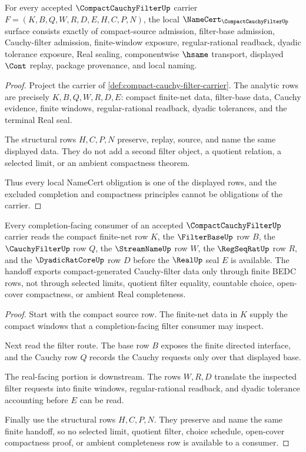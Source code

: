 \begin{theorem}
\label{thm:compact-cauchy-filter-namecert-obligations}
For every accepted $\CompactCauchyFilterUp$ carrier $F=(K,B,Q,W,R,D,E,H,C,P,N)$, the local $\NameCert_{\CompactCauchyFilterUp}$ surface consists exactly of compact-source admission, filter-base admission, Cauchy-filter admission, finite-window exposure, regular-rational readback, dyadic tolerance exposure, Real sealing, componentwise $\hsame$ transport, displayed $\Cont$ replay, package provenance, and local naming.
\end{theorem}
\begin{proof}
Project the carrier of \autoref{def:compact-cauchy-filter-carrier}. The analytic rows are precisely $K,B,Q,W,R,D,E$: compact finite-net data, filter-base data, Cauchy evidence, finite windows, regular-rational readback, dyadic tolerances, and the terminal Real seal.

The structural rows $H,C,P,N$ preserve, replay, source, and name the same displayed data. They do not add a second filter object, a quotient relation, a selected limit, or an ambient compactness theorem.

Thus every local NameCert obligation is one of the displayed rows, and the excluded completion and compactness principles cannot be obligations of the carrier.
\end{proof}

\begin{theorem}
\label{thm:compact-cauchy-filter-finite-net-handoff}
Every completion-facing consumer of an accepted $\CompactCauchyFilterUp$ carrier reads the compact finite-net row $K$, the $\FilterBaseUp$ row $B$, the $\CauchyFilterUp$ row $Q$, the $\StreamNameUp$ row $W$, the $\RegSeqRatUp$ row $R$, and the $\DyadicRatCoreUp$ row $D$ before the $\RealUp$ seal $E$ is available. The handoff exports compact-generated Cauchy-filter data only through finite BEDC rows, not through selected limits, quotient filter equality, countable choice, open-cover compactness, or ambient Real completeness.
\end{theorem}
\begin{proof}
Start with the compact source row. The finite-net data in $K$ supply the compact windows that a completion-facing filter consumer may inspect.

Next read the filter route. The base row $B$ exposes the finite directed interface, and the Cauchy row $Q$ records the Cauchy requests only over that displayed base.

The real-facing portion is downstream. The rows $W,R,D$ translate the inspected filter requests into finite windows, regular-rational readback, and dyadic tolerance accounting before $E$ can be read.

Finally use the structural rows $H,C,P,N$. They preserve and name the same finite handoff, so no selected limit, quotient filter, choice schedule, open-cover compactness proof, or ambient completeness row is available to a consumer.
\end{proof}

